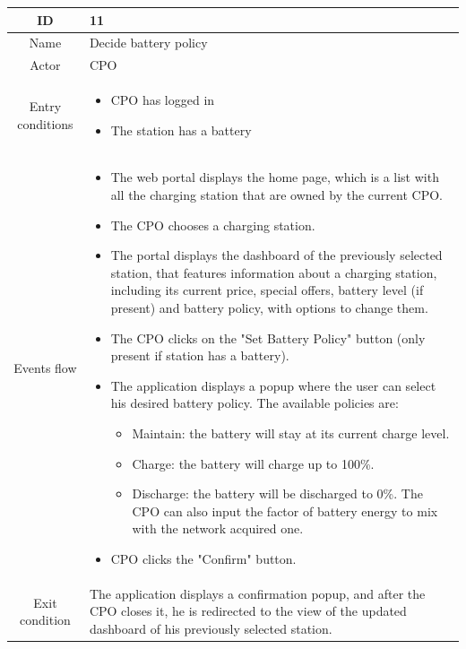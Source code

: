 \begin{longtable}{|c| p{10cm}|}
    \hline ID        & 11\\
    \hline
    Name     & Decide battery policy \\
    \hline
    Actor            & CPO\\
    \hline
    Entry conditions & \begin{itemize}[nosep,after=\strut]
        \item CPO has logged in
        \item The station has a battery
    \end{itemize}\\
    \hline
    Events flow      & \begin{itemize}[nosep,after=\strut]
        \item The web portal displays the home page, which is a list with all the charging station that are owned by the current CPO.
        \item The CPO chooses a charging station.
        \item The portal displays the dashboard of the previously selected station, that features information about a charging station, including its current price, special offers, battery level (if present) and battery policy, with options to change them.
        \item The CPO clicks on the "Set Battery Policy" button (only present if station has a battery).
        \item{The application displays a popup where the user can select his desired battery policy. The available policies are: \begin{itemize}
        \item Maintain: the battery will stay at its current charge level.
        \item Charge: the battery will charge up to 100\%. 
        \item Discharge: the battery will be discharged to 0\%. The CPO can also input the factor of battery energy to mix with the network acquired one.
        \end{itemize}
        }
        \item CPO clicks the "Confirm" button.
    \end{itemize}\\
    \hline
    Exit condition   & The application displays a confirmation popup, and after the CPO closes it, he is redirected to the view of the updated dashboard of his previously selected station.\\

\end{longtable}
